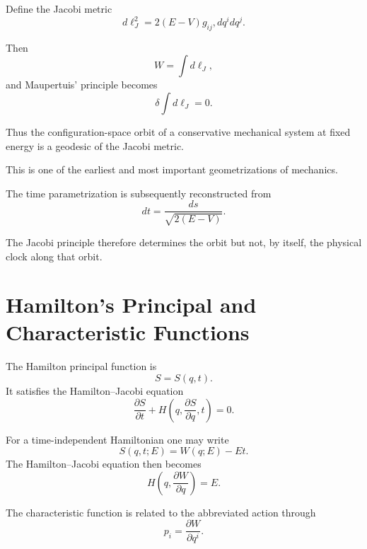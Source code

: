 Define the Jacobi metric
\begin{equation}
\boxed{
d\ell_J^2
=
2(E-V)g_{ij},dq^i dq^j.
}
\label{eq:jacobi-metric}
\end{equation}

Then
\begin{equation}
W=\int d\ell_J,
\end{equation}
and Maupertuis' principle becomes
\begin{equation}
\boxed{
\delta\int d\ell_J=0.
}
\end{equation}

Thus the configuration-space orbit of a conservative mechanical system at fixed energy is a geodesic of the Jacobi metric.

This is one of the earliest and most important geometrizations of mechanics.

The time parametrization is subsequently reconstructed from
\begin{equation}
dt
=
\frac{ds}{\sqrt{2(E-V)}}.
\end{equation}

The Jacobi principle therefore determines the orbit but not, by itself, the physical clock along that orbit.

\section{Hamilton's Principal and Characteristic Functions}

The Hamilton principal function is
\begin{equation}
S=S(q,t).
\end{equation}
It satisfies the Hamilton--Jacobi equation
\begin{equation}
\boxed{
\frac{\partial S}{\partial t}
+
H\left(q,\frac{\partial S}{\partial q},t\right)
=0.
}
\label{eq:HJE}
\end{equation}

For a time-independent Hamiltonian one may write
\begin{equation}
S(q,t;E)
=
W(q;E)-Et.
\end{equation}
The Hamilton--Jacobi equation then becomes
\begin{equation}
\boxed{
H\left(q,\frac{\partial W}{\partial q}\right)=E.
}
\label{eq:stationary-HJ}
\end{equation}

The characteristic function is related to the abbreviated action through
\begin{equation}
p_i
=
\frac{\partial W}{\partial q^i}.
\end{equation}

